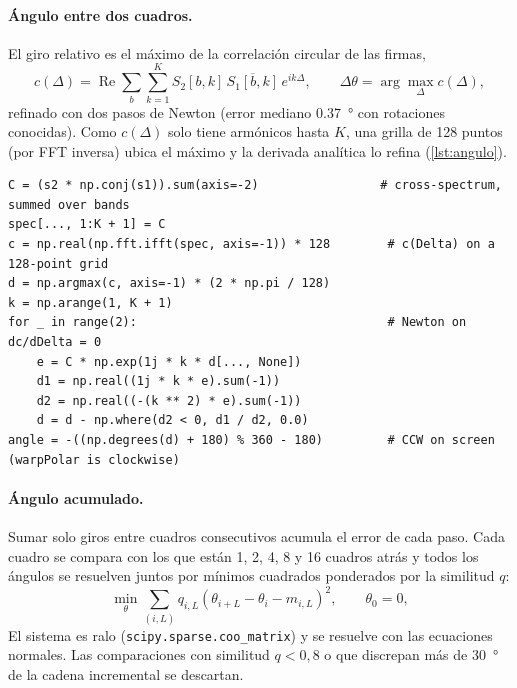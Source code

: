 \paragraph{Ángulo entre dos cuadros.} El giro relativo es el máximo de la correlación circular de las
firmas,
\begin{equation}
  c(\Delta)=\operatorname{Re}\sum_b\sum_{k=1}^{K} S_2[b,k]\,\overline{S_1[b,k]}\,e^{ik\Delta},\qquad
  \Delta\theta=\arg\max_\Delta c(\Delta),
\end{equation}
refinado con dos pasos de Newton (error mediano \SI{0.37}{\degree} con rotaciones conocidas). Como
$c(\Delta)$ solo tiene armónicos hasta $K$, una grilla de 128 puntos (por FFT inversa) ubica el
máximo y la derivada analítica lo refina (\cref{lst:angulo}).

\begin{lstlisting}[caption={Giro relativo entre dos firmas (\texttt{core/rotation.py}, resumido).}, label=lst:angulo]
C = (s2 * np.conj(s1)).sum(axis=-2)                 # cross-spectrum, summed over bands
spec[..., 1:K + 1] = C
c = np.real(np.fft.ifft(spec, axis=-1)) * 128        # c(Delta) on a 128-point grid
d = np.argmax(c, axis=-1) * (2 * np.pi / 128)
k = np.arange(1, K + 1)
for _ in range(2):                                   # Newton on dc/dDelta = 0
    e = C * np.exp(1j * k * d[..., None])
    d1 = np.real((1j * k * e).sum(-1))
    d2 = np.real((-(k ** 2) * e).sum(-1))
    d = d - np.where(d2 < 0, d1 / d2, 0.0)
angle = -((np.degrees(d) + 180) % 360 - 180)         # CCW on screen (warpPolar is clockwise)
\end{lstlisting}

\paragraph{Ángulo acumulado.} Sumar solo giros entre cuadros consecutivos acumula el error de cada
paso. Cada cuadro se compara con los que están 1, 2, 4, 8 y 16 cuadros atrás y todos los ángulos se
resuelven juntos por mínimos cuadrados ponderados por la similitud $q$:
\begin{equation}
  \min_{\theta}\sum_{(i,L)} q_{i,L}\left(\theta_{i+L}-\theta_i-m_{i,L}\right)^2,\qquad \theta_0=0,
\end{equation}
El sistema es ralo (\texttt{scipy.sparse.coo\_matrix}) y se resuelve con las ecuaciones normales.
Las comparaciones con similitud $q<0{,}8$ o que discrepan más de \SI{30}{\degree} de la cadena
incremental se descartan.

